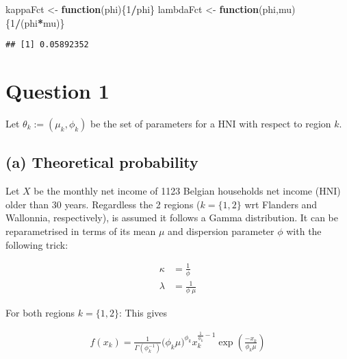 \documentclass[
]{article}
\newenvironment{Shaded}{\begin{snugshade}}{\end{snugshade}}
\newcommand{\ControlFlowTok}[1]{\textcolor[rgb]{0.13,0.29,0.53}{\textbf{#1}}}
\newcommand{\DecValTok}[1]{\textcolor[rgb]{0.00,0.00,0.81}{#1}}
\newcommand{\NormalTok}[1]{#1}
\newcommand{\OperatorTok}[1]{\textcolor[rgb]{0.81,0.36,0.00}{\textbf{#1}}}
\newcommand{\StringTok}[1]{\textcolor[rgb]{0.31,0.60,0.02}{#1}}
\begin{document}
\begin{Shaded}
\begin{Highlighting}[]
\NormalTok{kappaFct <-}\StringTok{ }\ControlFlowTok{function}\NormalTok{(phi)\{}\DecValTok{1}\OperatorTok{/}\NormalTok{phi\}}
\NormalTok{lambdaFct <-}\StringTok{ }\ControlFlowTok{function}\NormalTok{(phi,mu)\{}\DecValTok{1}\OperatorTok{/}\NormalTok{(phi}\OperatorTok{*}\NormalTok{mu)\}}
\end{Highlighting}
\end{Shaded}

\begin{verbatim}
## [1] 0.05892352
\end{verbatim}

\hypertarget{question-1}{%
\section{Question 1}\label{question-1}}

Let \(\theta_k:= (\mu_k, \phi_k)\) be the set of parameters for a HNI
with respect to region \(k\).

\hypertarget{a-theoretical-probability}{%
\subsection{(a) Theoretical
probability}\label{a-theoretical-probability}}

Let \(X\) be the monthly net income of 1123 Belgian households net
income (HNI) older than 30 years. Regardless the 2 regions
(\(k=\{1,2\}\) wrt Flanders and Wallonnia, respectively), is assumed it
follows a Gamma distribution. It can be reparametrised in terms of its
mean \(\mu\) and dispersion parameter \(\phi\) with the following trick:

\begin{equation}
\begin{split}
\kappa & = \frac{1}{\phi} \\
\lambda & = \frac{1}{\phi\; \mu}
\end{split}
\end{equation}

For both regions \(k=\{1,2\}\): This gives

\begin{equation}
\begin{split}
f(x_k) = \frac{1}{\Gamma(\phi_k^{-1})} \big( \phi_k \mu \big)^{\phi_k} x_k^{\frac{1}{\phi_k}-1} \exp{(\frac{-x_k}{\phi_k \mu})}
\end{split}
\end{equation}
\end{document}
